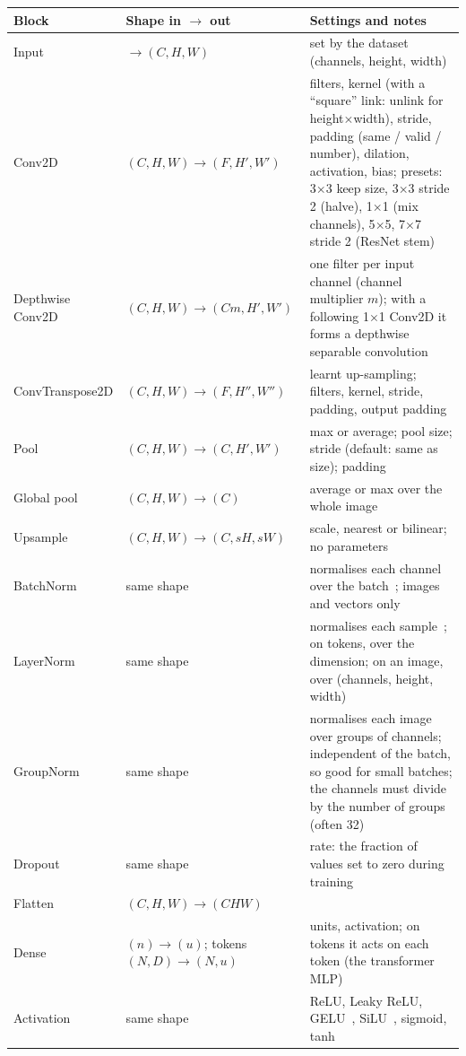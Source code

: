 \documentclass[11pt,a4paper]{article}
\begin{document}
\begin{longtable}{@{}p{2.9cm}p{3.7cm}p{8.4cm}@{}}
\toprule
\textbf{Block} & \textbf{Shape in $\rightarrow$ out} & \textbf{Settings and notes}\\
\midrule\endhead
Input & $\rightarrow (C,H,W)$ & set by the dataset (channels, height, width)\\
Conv2D & $(C,H,W)\rightarrow(F,H',W')$ & filters, kernel (with a ``square'' link: unlink for height$\times$width), stride, padding (same / valid / number), dilation, activation, bias; presets: 3$\times$3 keep size, 3$\times$3 stride 2 (halve), 1$\times$1 (mix channels), 5$\times$5, 7$\times$7 stride 2 (ResNet stem)\\
Depthwise Conv2D & $(C,H,W)\rightarrow(Cm,H',W')$ & one filter per input channel (channel multiplier $m$); with a following 1$\times$1 Conv2D it forms a depthwise separable convolution~\cite{howard2017mobilenets}\\
ConvTranspose2D & $(C,H,W)\rightarrow(F,H'',W'')$ & learnt up-sampling; filters, kernel, stride, padding, output padding\\
Pool & $(C,H,W)\rightarrow(C,H',W')$ & max or average; pool size; stride (default: same as size); padding\\
Global pool & $(C,H,W)\rightarrow(C)$ & average or max over the whole image\\
Upsample & $(C,H,W)\rightarrow(C,sH,sW)$ & scale, nearest or bilinear; no parameters\\
BatchNorm & same shape & normalises each channel over the batch~\cite{ioffe2015batchnorm}; images and vectors only\\
LayerNorm & same shape & normalises each sample~\cite{ba2016layernorm}; on tokens, over the dimension; on an image, over (channels, height, width)\\
GroupNorm & same shape & normalises each image over groups of channels; independent of the batch, so good for small batches; the channels must divide by the number of groups (often 32)\\
Dropout & same shape & rate: the fraction of values set to zero during training~\cite{srivastava2014dropout}\\
Flatten & $(C,H,W)\rightarrow(CHW)$ & \\
Dense & $(n)\rightarrow(u)$; tokens $(N,D)\rightarrow(N,u)$ & units, activation; on tokens it acts on each token (the transformer MLP)\\
Activation & same shape & ReLU, Leaky ReLU, GELU~\cite{hendrycks2016gelu}, SiLU~\cite{ramachandran2017swish}, sigmoid, tanh\\

\end{longtable}
\end{document}
